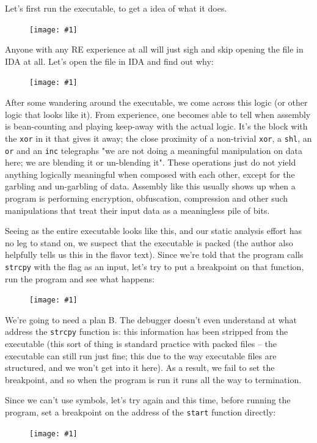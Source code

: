 \documentclass{article}
\newcommand{\displayimage}[1] {
\begin{figure}[H]
    \centering
    \texttt{[image: \#1]} 
\end{figure}
}
\newcommand{\xcode}[2]{\colorbox{ubuntuback}{\lstinline[language=#1]|#2|}}
\newcommand{\asm}[1]{\xcode{{[x86masm]assembler}}{#1}}
\begin{document}
Let's first run the executable, to get a idea of what it does.

\displayimage{../03_flag/program_output.png}

Anyone with any RE experience at all will just sigh and skip opening the file in IDA at all. Let's open the file in IDA and find out why: 

\displayimage{../03_flag/packed_assembly.png}

After some wandering around the executable, we come across this logic (or other logic that looks like it). From experience, one becomes able to tell when assembly is bean-counting and playing keep-away with the actual logic. It's the block with the \asm{xor} in it that gives it away; the close proximity of a non-trivial \asm{xor}, a \asm{shl}, an \asm{or} and an \asm{inc} telegraphs "we are not doing a meaningful manipulation on data here; we are blending it or un-blending it". These operations just do not yield anything logically meaningful when composed with each other, except for the garbling and un-garbling of data. Assembly like this usually shows up when a program is performing encryption, obfuscation, compression and other such manipulations that treat their input data as a meaningless pile of bits.

Seeing as the entire executable looks like this, and our static analysis effort has no leg to stand on, we suspect that the executable is packed (the author also helpfully tells us this in the flavor text). Since we're told that the program calls \xcode{C}{strcpy} with the flag as an input, let's try to put a breakpoint on that function, run the program and see what happens:

\displayimage{../03_flag/first_attempt.png}

We're going to need a plan B. The debugger doesn't even understand at what address the \xcode{C}{strcpy} function is: this information has been stripped from the executable (this sort of thing is standard practice with packed files -- the executable can still run just fine; this due to the way executable files are structured, and we won't get into it here). As a result, we fail to set the breakpoint, and so when the program is run it runs all the way to termination.

Since we can't use symbols, let's try again and this time, before running the program, set a breakpoint on the address of the \xcode{C}{start} function directly:

\displayimage{../03_flag/start_breakpoint.png}
\end{document}
